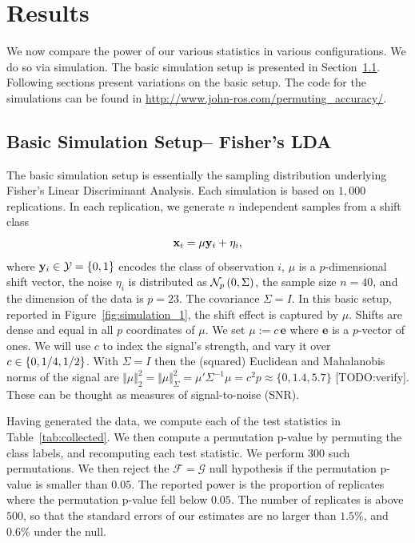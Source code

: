 \documentclass[]{bio}
\begin{document}
\section{Results}
\label{sec:results}
We now compare the power of our various statistics in various configurations. 
We do so via simulation.
The basic simulation setup is presented in Section~\ref{sec:simulation_details}.
Following sections present variations on the basic setup.
The \R code for the simulations can be found in \url{http://www.john-ros.com/permuting_accuracy/}.


\subsection{Basic Simulation Setup-- Fisher's LDA}
\label{sec:simulation_details}

The basic simulation setup is essentially the sampling distribution underlying Fisher's Linear Discriminant Analysis. 
Each simulation is based on $1,000$ replications. 
In each replication, we generate $n$ independent samples from a shift class 
\begin{align}
\label{eq:distribution}
\mathbf{x}_i = \mu \mathbf{y}_i + \eta_i,
\end{align}
where $\mathbf{y}_i \in \mathcal{Y}=\{ 0,1 \}$ encodes the class of observation $i$, $\mu$ is a $p$-dimensional shift vector, the noise $\eta_i$ is distributed as $\mathcal{N}_{p}\left(0,\Sigma\right)$, the sample size $n=40$, and the dimension of the data is $p=23$. 
The covariance $\Sigma=I$. 
In this basic setup, reported in Figure~\ref{fig:simulation_1}, the shift effect is captured by $\mu$. 
Shifts are dense and equal in all $p$ coordinates of $\mu$.
We set $\mu:=c \, \textbf{e}$ where $\textbf{e}$ is a $p$-vector of ones. 
We will use $c$ to index the signal's strength, and vary it over $c \in \{ 0,1/4,1/2 \}$.
With $\Sigma=I$ then the (squared) Euclidean and Mahalanobis norms of the signal are $\Vert \mu \Vert_2^2=\Vert \mu \Vert_\Sigma^2=\mu' \Sigma^{-1} \mu= c^2 p\approx \{0,1.4,5.7\}$ [TODO:verify]. 
These can be thought as measures of signal-to-noise (SNR). 

Having generated the data, we compute each of the test statistics in Table~\ref{tab:collected}.
We then compute a permutation p-value by permuting the class labels, and recomputing each test statistic. 
We perform $300$ such permutations. 
We then reject the $\mathcal{F}=\mathcal{G}$ null hypothesis if the permutation p-value is smaller than $0.05$.
The reported power is the proportion of replicates where the permutation p-value fell below $0.05$.
The number of replicates is above $500$, so that the standard errors of our estimates are no larger than $1.5\%$, and $0.6\%$ under the null. 
\end{document}
